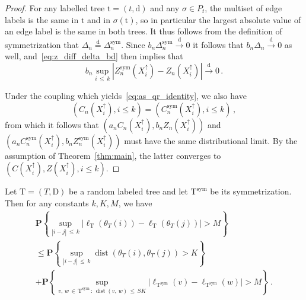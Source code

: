 \documentclass[AHL,Unicode,longabstracts,published]{cedram}
\newcommand{\rD}{\mathrm{D}}
\newcommand{\rT}{\mathrm{T}}
\newcommand{\rd}{\mathrm{d}}
\newcommand{\rt}{\mathrm{t}}
\DeclareMathOperator{\sym}{sym}
\DeclareMathOperator{\dist}{dist}
\newcommand{\p}[1]{\mathbf{P}\left\{#1\right\}}
\newcommand{\unif}{\ensuremath{X}}
\newcommand{\eqdist}{\ensuremath{\stackrel{\mathrm{d}}{=}}}
\newcommand{\convdist}{\ensuremath{\stackrel{\mathrm{d}}{\rightarrow}}}
\begin{document}
\begin{proof}
For any labelled tree $\rt=(t,\rd)$ and any $\sigma \in P_t$, the multiset of edge labels is the same in $\rt$ and in $\sigma(\rt)$, so in particular the largest absolute value of an edge label is the same in both trees. It thus follows from the definition of symmetrization that $\Delta_n \eqdist \Delta_n^{\sym}$. Since $b_n\Delta_n^{\sym} \convdist 0$ it follows that $b_n \Delta_n \convdist 0$ as well, and~\eqref{eq:z_diff_delta_bd} then implies that
\[
b_n \sup_{i\,\le\,k} \left|Z_n^{\sym}\left(\unif_i^\uparrow\right) - Z_n\left(\unif_i^\uparrow\right)\right|
\convdist 0\,.
\]

Under the coupling which yields~\eqref{eq:as_qr_identity}, we also have
\[
\left(C_n\left(\unif_i^\uparrow\right),i \le k\right)=\left(C_n^{\sym}\left(\unif_i^\uparrow\right),i \le k\right)\,,
\]
from which it follows that $(a_n C_n(\unif_i^\uparrow),b_n Z_n(\unif_i^\uparrow))$ and $(a_n C_n^{\sym}(\unif_i^\uparrow),b_n Z_n^{\sym}(\unif_i^\uparrow))$ must have the same distributional limit. By the assumption of Theorem~\ref{thm:main}, the latter converges to $(C(\unif_i^\uparrow),Z(\unif_i^\uparrow),i \le k)$.
\end{proof}

\begin{lemm}\label{lem:boundLabels}
Let $\rT=(T,\rD)$ be a random labeled tree and let $\rT^{\sym}$ be its symmetrization. Then for any constants $k,K,M$, we have
\begin{multline*}
 \p{\sup_{|i-j|\,\le\,k} \left|\ell_\rT(\theta_T(i)) -\ell_\rT(\theta_T(j))\right| > M}\\
\le 
\p{\sup_{|i-j|\,\le\,k} \dist(\theta_T(i),\theta_T(j)) > K}\\
 +\p{
\sup_{v,\,w\,\in\,\rT^{\sym}\,:\,\dist(v,\,w)\,\le\,SK} \left|\ell_{\rT^{\sym}}(v) - \ell_{\rT^{\sym}}(w)\right| > M}\,.
\end{multline*}
\end{lemm}
\end{document}

